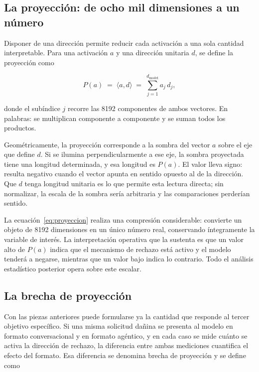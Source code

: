 \subsection{La proyección: de ocho mil dimensiones a un número}

Disponer de una dirección permite reducir cada activación a una sola cantidad
interpretable. Para una activación $a$ y una dirección unitaria $d$, se define
la proyección como

\begin{equation}
  P(a) \;=\; \langle a, d\rangle \;=\; \sum_{j=1}^{d_{\text{model}}} a_j\, d_j,
  \label{eq:proyeccion}
\end{equation}

\noindent
donde el subíndice $j$ recorre las 8192 componentes de ambos vectores. En
palabras: se multiplican componente a componente y se suman todos los
productos.

Geométricamente, la proyección corresponde a la sombra del vector $a$ sobre el
eje que define $d$. Si se ilumina perpendicularmente a ese eje, la sombra
proyectada tiene una longitud determinada, y esa longitud es $P(a)$. El valor
lleva signo: resulta negativo cuando el vector apunta en sentido opuesto al de
la dirección. Que $d$ tenga longitud unitaria es lo que permite esta lectura
directa; sin normalizar, la escala de la sombra sería arbitraria y las
comparaciones perderían sentido.

La ecuación~\eqref{eq:proyeccion} realiza una compresión considerable: convierte
un objeto de 8192 dimensiones en un único número real, conservando íntegramente
la variable de interés. La interpretación operativa que la sustenta es que un
valor alto de $P(a)$ indica que el mecanismo de rechazo está activo y el modelo
tenderá a negarse, mientras que un valor bajo indica lo contrario. Todo el
análisis estadístico posterior opera sobre este escalar.

\subsection{La brecha de proyección}
\label{subsec:deltap}

Con las piezas anteriores puede formularse ya la cantidad que responde al
tercer objetivo específico. Si una misma solicitud dañina se presenta al modelo
en formato conversacional y en formato agéntico, y en cada caso se mide cuánto
se activa la dirección de rechazo, la diferencia entre ambas mediciones
cuantifica el efecto del formato. Esa diferencia se denomina brecha de
proyección y se define como

